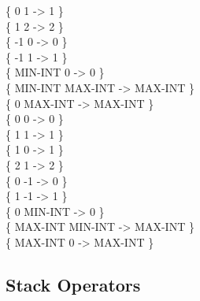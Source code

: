 \begin{tt}
\{       0       1  ->       1 \} \\
\{       1       2  ->       2 \} \\
\{      -1       0  ->       0 \} \\
\{      -1       1  ->       1 \} \\
\{ MIN-INT       0  ->       0 \} \\
\{ MIN-INT MAX-INT  -> MAX-INT \} \\
\{       0 MAX-INT  -> MAX-INT \} \\
\{       0       0  ->       0 \} \\
\{       1       1  ->       1 \} \\
\{       1       0  ->       1 \} \\
\{       2       1  ->       2 \} \\
\{       0      -1  ->       0 \} \\
\{       1      -1  ->       1 \} \\
\{       0 MIN-INT  ->       0 \} \\
\{ MAX-INT MIN-INT  -> MAX-INT \} \\
\{ MAX-INT       0  -> MAX-INT \} \\
\end{tt}

\subsection{Stack Operators}


